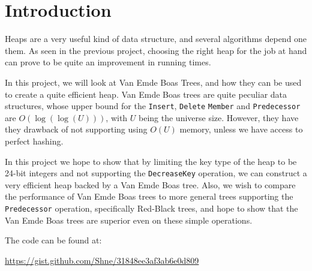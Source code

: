 \section{Introduction}

Heaps are a very useful kind of data structure, and several algorithms depend one them. As seen in the previous project, choosing the right heap for the job at hand can prove to be quite an improvement in running times.

In this project, we will look at Van Emde Boas Trees, and how they can be used to create a quite efficient heap. Van Emde Boas trees are quite peculiar data structures, whose upper bound for the \texttt{Insert}, \texttt{Delete} \texttt{Member} and \texttt{Predecessor} are $O(\log ( \log (U)))$, with $U$ being the universe size. However, they have they drawback of not supporting  using $O(U)$ memory, unless we have access to perfect hashing.

In this project we hope to show that by limiting the key type of the heap to be 24-bit integers and not supporting the \texttt{DecreaseKey} operation, we can construct a very efficient heap backed by a Van Emde Boas tree. Also, we wish to compare the performance of Van Emde Boas trees to more general trees supporting the \texttt{Predecessor} operation, specifically Red-Black trees, and hope to show that the Van Emde Boas trees are superior even on these simple operations.

The code can be found at:

\url{https://gist.github.com/Shne/31848ee3af3ab6e0d809}
